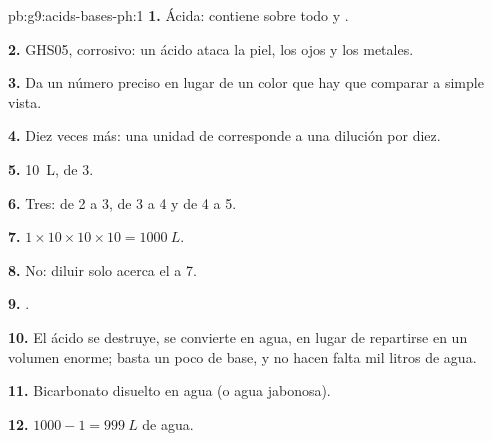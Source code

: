 \begin{solution}{pb:g9:acids-bases-ph:1}
\textbf{1.} Ácida: contiene sobre todo   y
.

\textbf{2.} GHS05, corrosivo: un ácido ataca la piel, los ojos y los
metales.

\textbf{3.} Da un número preciso en lugar de un color que hay que
comparar a simple vista.

\textbf{4.} Diez veces más: una unidad de  corresponde a una dilución
por diez.

\textbf{5.} \qty{10}{L}, de  3.

\textbf{6.} Tres: de  2 a 3, de 3 a 4 y de 4 a 5.

\textbf{7.} $1 \times 10 \times 10 \times 10 = \qty{1000}{L}$.

\textbf{8.} No: diluir solo acerca el  a 7.

\textbf{9.} .

\textbf{10.} El ácido se destruye, se convierte en agua, en lugar de
repartirse en un volumen enorme; basta un poco de base, y no hacen falta
mil litros de agua.

\textbf{11.} Bicarbonato disuelto en agua (o agua jabonosa).

\textbf{12.} $1000 - 1 = \qty{999}{L}$ de agua.
\end{solution}
